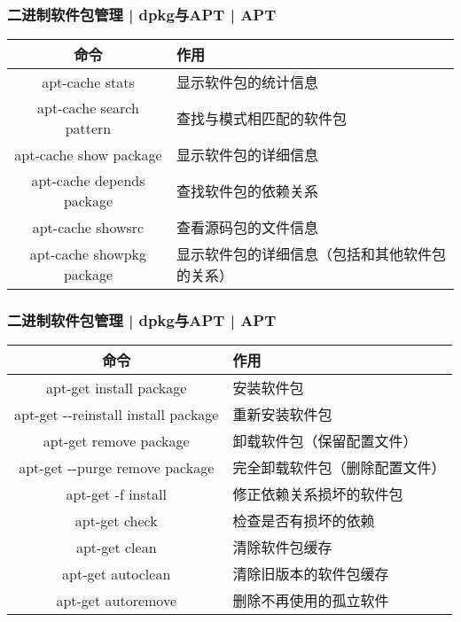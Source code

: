 \begin{frame}
  \frametitle{二进制软件包管理 | dpkg与APT | APT}
  \begin{table}
    \centering
    \begin{tabularx}{\textwidth}{cX}
      \hline
      \rowcolor{blue!50}命令 & 作用\\
      \hline
      apt-cache stats & 显示软件包的统计信息\\
      apt-cache search pattern & 查找与模式相匹配的软件包\\
      apt-cache show package & 显示软件包的详细信息\\
      apt-cache depends package & 查找软件包的依赖关系\\
      apt-cache showsrc & 查看源码包的文件信息\\
      apt-cache showpkg package & 显示软件包的详细信息（包括和其他软件包的关系）\\
      \hline
    \end{tabularx}
  \end{table}
\end{frame}

\begin{frame}[fragile]
  \frametitle{二进制软件包管理 | dpkg与APT | \alert{APT}}
  \begin{table}
    \centering
    \begin{tabularx}{\textwidth}{cX}
      \hline
      \rowcolor{blue!50}命令 & 作用\\
      \hline
      apt-get install package & 安装软件包\\
      apt-get -\!-reinstall install package & 重新安装软件包\\
      apt-get remove package & 卸载软件包（保留配置文件）\\
      apt-get -\!-purge remove package & 完全卸载软件包（删除配置文件）\\
      apt-get -f install & 修正依赖关系损坏的软件包\\
      apt-get check & 检查是否有损坏的依赖\\
      apt-get clean & 清除软件包缓存\\
      apt-get autoclean & 清除旧版本的软件包缓存\\
      apt-get autoremove & 删除不再使用的孤立软件\\
      \hline
    \end{tabularx}
  \end{table}
\end{frame}

